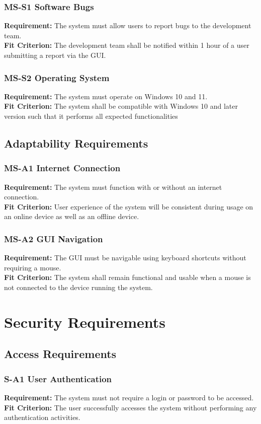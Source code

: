 \documentclass[12pt]{article}
\begin{document}
\subsubsection*{MS-S1 Software Bugs}
\textbf{Requirement:} The system must allow users to report bugs to the development team. \\ 
\textbf{Fit Criterion:} The development team shall be notified within 1 hour of a user submitting a report via the GUI.
\subsubsection*{MS-S2 Operating System}
\textbf{Requirement:} The system must operate on Windows 10 and 11. \\ 
\textbf{Fit Criterion:} The system shall be compatible with Windows 10 and later version such that it performs all expected functionalities

\subsection{Adaptability Requirements}
\subsubsection*{MS-A1 Internet Connection}
\textbf{Requirement:} The system must function with or without an internet connection. \\ 
\textbf{Fit Criterion:} User experience of the system will be consistent during usage on an online device as well as an offline device.
\subsubsection*{MS-A2 GUI Navigation}
\textbf{Requirement:} The GUI must be navigable using keyboard shortcuts without requiring a mouse. \\ 
\textbf{Fit Criterion:} The system shall remain functional and usable when a mouse is not connected to the device running the system.


\section{Security Requirements}
\subsection{Access Requirements}
\subsubsection*{S-A1 User Authentication}
\textbf{Requirement:} The system must not require a login or password to be accessed. \\ 
\textbf{Fit Criterion:} The user successfully accesses the system without performing any authentication activities.
\end{document}
